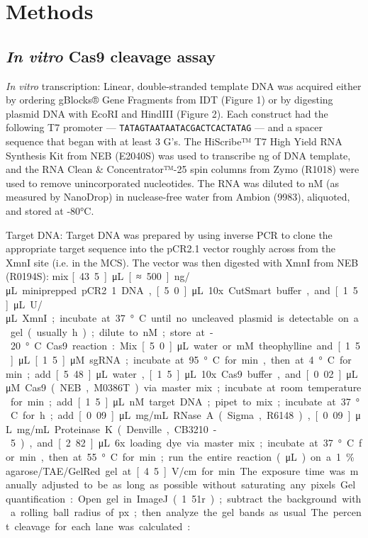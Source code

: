 \documentclass{article}
\newcommand\reffig[1]{Figure #1}
\newcommand\seq[1]{\texttt{#1}}
\newcommand\latin[1]{\emph{#1}}
\newcommand\hr[1]{\unit[#1]{h}}
\newcommand\mgml[1]{\unit[#1]{mg/mL}}
\newcommand\minx[1]{\unit[#1]{min}}
\newcommand\mm[1]{\unit[#1]{mM}}
\newcommand\ngx[1]{\unit[#1]{ng}}
\newcommand\ngul[1]{\unit[#1]{ng/μL}}
\newcommand\nm[1]{\unit[#1]{nM}}
\newcommand\px[1]{\unit[#1]{px}}
\newcommand\ul[1]{\unit[#1]{μL}}
\newcommand\um[1]{\unit[#1]{μM}}
\newcommand\uul[1]{\unit[#1]{U/μL}}
\newcommand\vcm[1]{\unit[#1]{V/cm}}
\begin{document}
\section{Methods}

\subsection{\latin{In vitro} Cas9 cleavage assay}

\latin{In vitro} transcription: Linear, double-stranded template DNA was 
acquired either by ordering gBlocks® Gene Fragments from IDT (\reffig{1}) or by 
digesting plasmid DNA with EcoRI and HindIII (\reffig{2}).  Each construct had 
the following T7 promoter --- \seq{TATAGTAATAATACGACTCACTATAG} --- and a spacer 
sequence that began with at least 3 G's.  The HiScribe™ T7 High Yield RNA 
Synthesis Kit from NEB (E2040S) was used to transcribe \ngx{10-50} of DNA 
template, and the RNA Clean \& Concentrator™-25 spin columns from Zymo (R1018) 
were used to remove unincorporated nucleotides.  The RNA was diluted to 
\nm{1500} (as measured by NanoDrop) in nuclease-free water from Ambion (9983), 
aliquoted, and stored at -80°C.  

Target DNA: Target DNA was prepared by using inverse PCR to clone the 
appropriate target sequence into the pCR2.1 vector roughly across from the XmnI 
site (i.e. in the MCS).  The vector was then digested with XmnI from NEB 
(R0194S): mix \ul{43.5} \ngul{≈500} miniprepped pCR2.1 DNA, \ul{5.0} 10x 
CutSmart buffer, and \ul{1.5} \uul{20} XmnI; incubate at 37°C until no 
uncleaved plasmid is detectable on a gel (usually \hr{1-2}); dilute to \nm{30}; 
store at -20°C.  

Cas9 reaction: Mix \ul{5.0} water or \mm{30} theophylline and \ul{1.5} \um{1.5}
sgRNA; incubate at 95°C for \minx{3}, then at 4°C for \minx{1}; add \ul{5.48} 
water, \ul{1.5} 10x Cas9 buffer, and \ul{0.02} \um{20} Cas9 (NEB, M0386T) via 
master mix; incubate at room temperature for \minx{10}; add \ul{1.5} \nm{30} 
target DNA; pipet to mix; incubate at 37°C for \hr{1}; add \ul{0.09} \mgml{20} 
RNase~A (Sigma, R6148), \ul{0.09} \mgml{20} Proteinase~K (Denville, CB3210-5), 
and \ul{2.82} 6x loading dye via master mix; incubate at 37°C for \minx{20}, 
then at 55°C for \minx{20}; run the entire reaction (\ul{18}) on a 1\% 
agarose/TAE/GelRed gel at \vcm{4.5} for \minx{70}.  The exposure time was 
manually adjusted to be as long as possible without saturating any pixels.

Gel quantification: Open gel in ImageJ (1.51r); subtract the background with a 
rolling ball radius of \px{50}; then analyze the gel bands as usual.  The 
percent cleavage for each lane was calculated:
\end{document}
